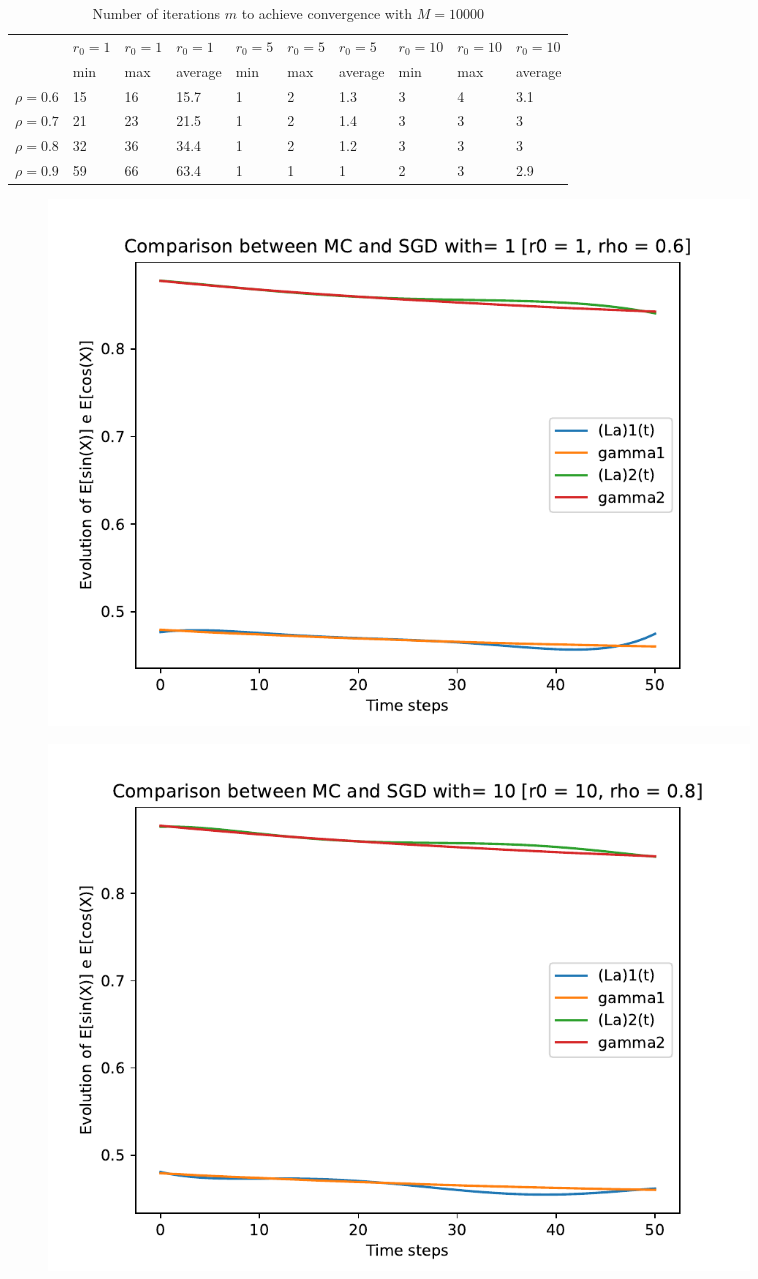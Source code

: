 \documentclass[a4paper,11pt,openright]{report}
\begin{document}
\begin{table}[H]
\centering
\addtolength{\leftskip}{-1.5cm}
\addtolength{\rightskip}{-1.5cm}
\begin{tabular}{|c|lllllllll|}
\hline
$ $ & $r_0 = 1$ & $r_0 = 1$ & $r_0 = 1$ & $r_0 = 5$ & $r_0 = 5$ & $r_0 = 5$ & $r_0 = 10$ & $r_0 = 10$ & $r_0 = 10$  \\
$ $ & min & max & average & min & max & average & min & max & average \\ 
\hline
$\rho = 0.6$ & 15 & 16 & 15.7 & 1 & 2 & 1.3 & 3 & 4 & 3.1\\

$\rho = 0.7$ & 21 & 23 & 21.5 & 1 & 2 & 1.4 & 3 & 3 & 3\\

$\rho = 0.8$ & 32 & 36 & 34.4 & 1 & 2 & 1.2 & 3 & 3 & 3\\

$\rho = 0.9$ & 59 & 66 & 63.4 & 1 & 1 & 1 & 2 & 3 & 2.9\\
\hline
\end{tabular}
\caption{Number of iterations $m$ to achieve convergence with $M = 10000$}
\end{table}
\begin{figure}[H]
\centering
\includegraphics[width=0.9\textwidth]{images/graphs T = 0.5/n = 5, M = 1 sine and cosine.pdf}
\end{figure}
\begin{figure}[H]
\centering
\includegraphics[width=0.9\textwidth]{images/graphs T = 0.5/n = 5, M = 10 sine and cosine.pdf}
\end{figure}
\end{document}
